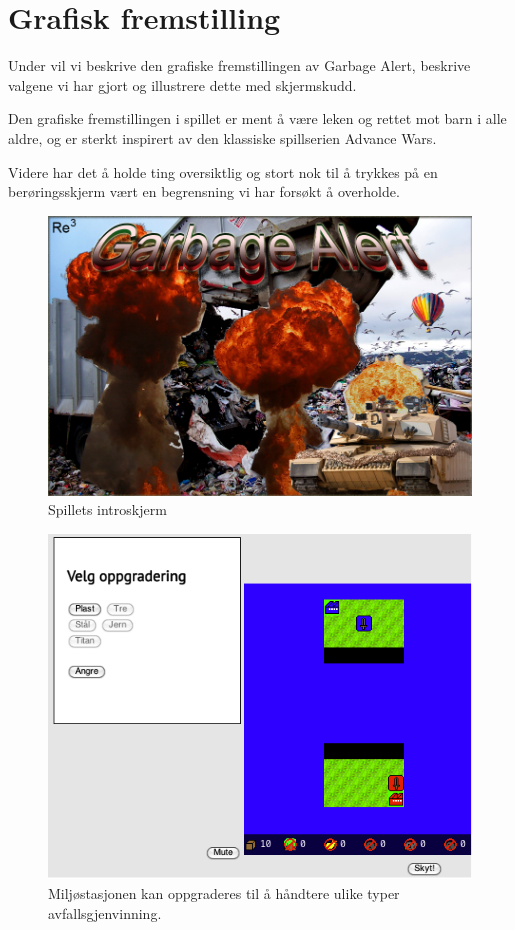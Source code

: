 \section{Grafisk fremstilling}
Under vil vi beskrive den grafiske fremstillingen av Garbage Alert, beskrive valgene vi har gjort og illustrere dette med skjermskudd.

Den grafiske fremstillingen i spillet er ment å være leken og rettet mot barn i alle aldre, og er sterkt inspirert av den klassiske spillserien Advance Wars\cite{advancewars}.

Videre har det å holde ting oversiktlig og stort nok til å trykkes på en berøringsskjerm vært en begrensning vi har forsøkt å overholde.


\begin{figure}
\centering
\includegraphics[width=\textwidth]{images/splashscreen.png}
\caption{Spillets introskjerm}
\label{fig:splashscreen}
\end{figure}

\begin{figure}
\centering
\includegraphics[width=\textwidth]{images/Oppgradering.png}
\caption{Miljøstasjonen kan oppgraderes til å håndtere ulike typer avfallsgjenvinning.}
\label{fig:Oppgradering}
\end{figure}

